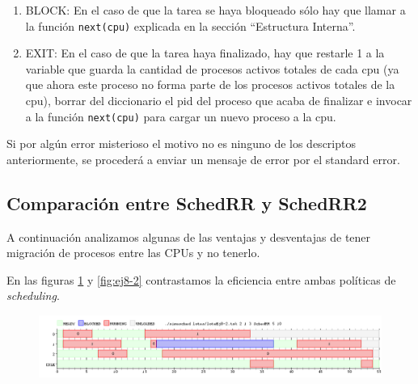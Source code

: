 \begin{itemize}
\begin{enumerate}
		\item BLOCK: En el caso de que la tarea se haya bloqueado s\'olo hay que llamar a la funci\'on \texttt{next(cpu)} explicada en la secci\'on ``Estructura Interna''.
		\item EXIT: En el caso de que la tarea haya finalizado, hay que restarle 1 a la variable que guarda la cantidad de procesos activos totales de cada cpu (ya que ahora este proceso no forma parte de los procesos activos totales de la cpu), borrar del diccionario el pid del proceso que acaba de finalizar e invocar a la funci\'on \texttt{next(cpu)} para cargar un nuevo proceso a la cpu.
	\end{enumerate}
	Si por alg\'un error misterioso el motivo no es ninguno de los descriptos anteriormente, se proceder\'a a enviar un mensaje de error por el standard error.
\end{itemize}

\subsection{Comparación entre SchedRR y SchedRR2}







A continuación analizamos algunas de las ventajas y desventajas de tener migración de procesos entre las CPUs y no tenerlo.

En las figuras \ref{fig:ej8-1} y \ref{fig:ej8-2} contrastamos la eficiencia entre ambas políticas de \emph{scheduling}.

\begin{figure}[H]
  \centering
  \includegraphics[width=1\textwidth]{img/imgEj8-1}
  \caption{}
  \label{fig:ej8-1}
\end{figure}



